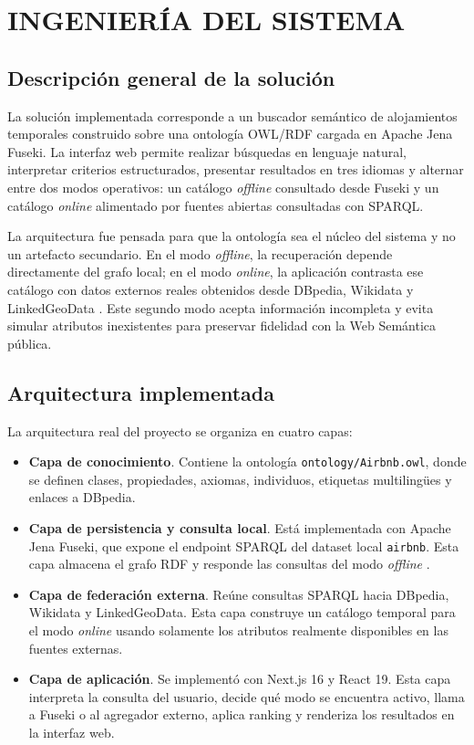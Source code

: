 \section{INGENIERÍA DEL SISTEMA}

\subsection{Descripción general de la solución}

La solución implementada corresponde a un buscador semántico de alojamientos temporales
construido sobre una ontología OWL/RDF cargada en Apache Jena Fuseki. La interfaz web
permite realizar búsquedas en lenguaje natural, interpretar criterios estructurados,
presentar resultados en tres idiomas y alternar entre dos modos operativos: un catálogo
\textit{offline} consultado desde Fuseki y un catálogo \textit{online} alimentado por
fuentes abiertas consultadas con SPARQL.

La arquitectura fue pensada para que la ontología sea el núcleo del sistema y no un
artefacto secundario. En el modo \textit{offline}, la recuperación depende directamente
del grafo local; en el modo \textit{online}, la aplicación contrasta ese catálogo con
datos externos reales obtenidos desde DBpedia, Wikidata y LinkedGeoData
\parencite{lehmann2015,wikidata,linkedgeodata}. Este segundo modo acepta información
incompleta y evita simular atributos inexistentes para preservar fidelidad con la Web
Semántica pública.

\subsection{Arquitectura implementada}

La arquitectura real del proyecto se organiza en cuatro capas:

\begin{itemize}
  \item \textbf{Capa de conocimiento}. Contiene la ontología
  \texttt{ontology/Airbnb.owl}, donde se definen clases, propiedades, axiomas,
  individuos, etiquetas multilingües y enlaces a DBpedia.

  \item \textbf{Capa de persistencia y consulta local}. Está implementada con Apache
  Jena Fuseki, que expone el endpoint SPARQL del dataset local \texttt{airbnb}. Esta
  capa almacena el grafo RDF y responde las consultas del modo \textit{offline}
  \parencite{jena-fuseki}.

  \item \textbf{Capa de federación externa}. Reúne consultas SPARQL hacia DBpedia,
  Wikidata y LinkedGeoData. Esta capa construye un catálogo temporal para el modo
  \textit{online} usando solamente los atributos realmente disponibles en las fuentes
  externas.

  \item \textbf{Capa de aplicación}. Se implementó con Next.js 16 y React 19. Esta
  capa interpreta la consulta del usuario, decide qué modo se encuentra activo, llama a
  Fuseki o al agregador externo, aplica ranking y renderiza los resultados en la
  interfaz web.
\end{itemize}

